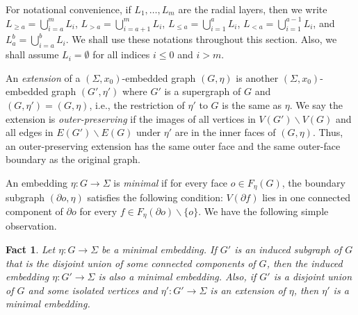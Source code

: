 \documentclass[a4paper,11pt]{article}
\numberwithin{lemma}{section}
\newtheorem{fact}[lemma]{Fact}
\begin{document}
For notational convenience, if $L_1,\dots,L_m$ are the radial layers, then we write $L_{\geq a} = \bigcup_{i=a}^m L_i$, $L_{> a} = \bigcup_{i=a+1}^m L_i$, $L_{\leq a} = \bigcup_{i=1}^a L_i$, $L_{< a} = \bigcup_{i=1}^{a-1} L_i$, and $L_a^b = \bigcup_{i=a}^b L_i$.
We shall use these notations throughout this section.
Also, we shall assume $L_i = \emptyset$ for all indices $i \leq 0$ and $i >m$.

An \emph{extension} of a $(\varSigma,x_0)$-embedded graph $(G,\eta)$ is another $(\varSigma,x_0)$-embedded graph $(G',\eta')$ where $G'$ is a supergraph of $G$ and $(G,\eta') = (G,\eta)$, i.e., the restriction of $\eta'$ to $G$ is the same as $\eta$.
We say the extension is \emph{outer-preserving} if the images of all vertices in $V(G') \backslash V(G)$ and all edges in $E(G') \backslash E(G)$ under $\eta'$ are in the inner faces of $(G,\eta)$.
Thus, an outer-preserving extension has the same outer face and the same outer-face boundary as the original graph.

An embedding $\eta\colon G \rightarrow \varSigma$ is \emph{minimal} if for every face $o \in F_\eta(G)$, the boundary subgraph $(\partial o,\eta)$ satisfies the following condition: $V(\partial f)$ lies in one connected component of $\partial o$ for every $f \in F_\eta(\partial o) \backslash \{o\}$.
We have the following simple observation.

\begin{fact}\label{fact-minimal}
Let $\eta\colon G \rightarrow \varSigma$ be a minimal embedding.
If $G'$ is an induced subgraph of $G$ that is the disjoint union of some connected components of $G$, then the induced embedding $\eta\colon G' \rightarrow \varSigma$ is also a minimal embedding.
Also, if $G'$ is a disjoint union of $G$ and some isolated vertices and $\eta'\colon G' \rightarrow \varSigma$ is an extension of $\eta$, then $\eta'$ is a minimal embedding.
\end{fact}
\end{document}
